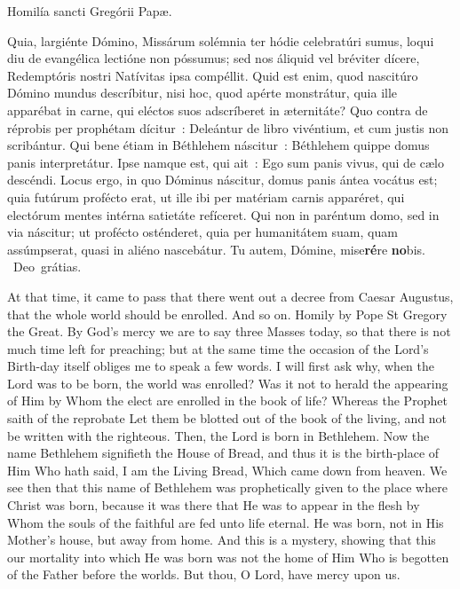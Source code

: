 {{\begin{parcolumns}[rulebetween,colwidths={1=.51\linewidth}]{2}
{Homilía sancti Gregórii Papæ.

Quia, largiénte Dómino, Missárum solémnia ter hódie celebratúri sumus, loqui diu de evangélica lectióne non póssumus; sed nos áliquid vel bréviter dícere, Redemptóris nostri Natívitas ipsa compéllit. Quid est enim, quod nascitúro Dómino mundus descríbitur, nisi hoc, quod apérte monstrátur, quia ille apparébat in carne, qui eléctos suos adscríberet in æternitáte? Quo contra de réprobis per prophétam dícitur~: Deleántur de libro vivéntium, et cum justis non scribántur. Qui bene étiam in Béthlehem náscitur~: Béthlehem quippe domus panis interpretátur. Ipse namque est, qui ait~: Ego sum panis vivus, qui de cælo descéndi. Locus ergo, in quo Dóminus náscitur, domus panis ántea vocátus est; quia futúrum profécto erat, ut ille ibi per matériam carnis apparéret, qui electórum mentes intérna satietáte refíceret. Qui non in paréntum domo, sed in via náscitur; ut profécto osténderet, quia per humanitátem suam, quam assúmpserat, quasi in aliéno nascebátur.
      Tu autem, Dómine, mise\textbf{ré}re \textbf{no}bis.
      \Rbar{}~Deo~grátias.}
    {At that time, it came to pass that there went out a decree from Caesar Augustus, that the whole world should be enrolled. And so on.
Homily by Pope St Gregory the Great.
By God's mercy we are to say three Masses today, so that there is not much time left for preaching; but at the same time the occasion of the Lord's Birth-day itself obliges me to speak a few words. I will first ask why, when the Lord was to be born, the world was enrolled? Was it not to herald the appearing of Him by Whom the elect are enrolled in the book of life? Whereas the Prophet saith of the reprobate Let them be blotted out of the book of the living, and not be written with the righteous. Then, the Lord is born in Bethlehem. Now the name Bethlehem signifieth the House of Bread, and thus it is the birth-place of Him Who hath said, I am the Living Bread, Which came down from heaven. We see then that this name of Bethlehem was prophetically given to the place where Christ was born, because it was there that He was to appear in the flesh by Whom the souls of the faithful are fed unto life eternal. He was born, not in His Mother's house, but away from home. And this is a mystery, showing that this our mortality into which He was born was not the home of Him Who is begotten of the Father before the worlds.
      But thou, O Lord, have mercy upon us.}
    \end{parcolumns}

  }

}
